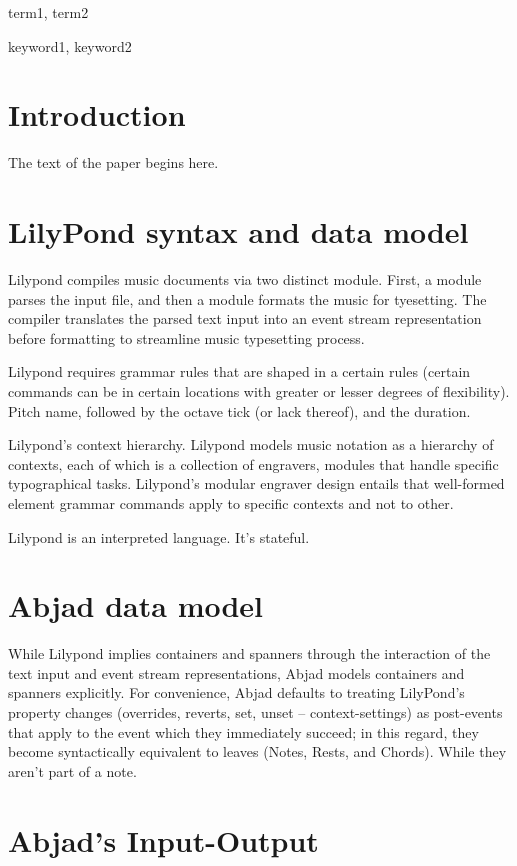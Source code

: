\documentclass{sigplanconf}
\begin{document}
\terms
term1, term2

\keywords
keyword1, keyword2

\section{Introduction}

The text of the paper begins here.

\section{LilyPond syntax and data model}
Lilypond compiles music documents via two distinct module. First, a module parses the input
file, and then a module formats the music for tyesetting. The compiler translates the parsed text input into an event stream representation before formatting to streamline music typesetting process.\cite{sandberg2006separating}

Lilypond requires grammar rules that are shaped in a certain rules (certain commands can be in certain locations with greater or lesser degrees of flexibility). Pitch name, followed by the octave tick (or lack thereof), and the duration. 

Lilypond's context hierarchy. Lilypond models music notation as a hierarchy of contexts, each of which is a collection of engravers, modules that handle specific typographical tasks. Lilypond's modular engraver design entails that well-formed element grammar commands apply to specific contexts and not to other.

Lilypond is an interpreted language. It's stateful.

\section{Abjad data model}
While Lilypond implies containers and spanners through the interaction of the text input and event stream representations, Abjad models containers and spanners explicitly. For convenience, Abjad defaults to treating LilyPond's property changes (overrides, reverts, set, unset -- context-settings) as post-events that apply to the event which they immediately succeed; in this regard, they become syntactically equivalent to leaves (Notes, Rests, and Chords). While they aren't part of a note.

\section{Abjad's Input-Output}
\end{document}
